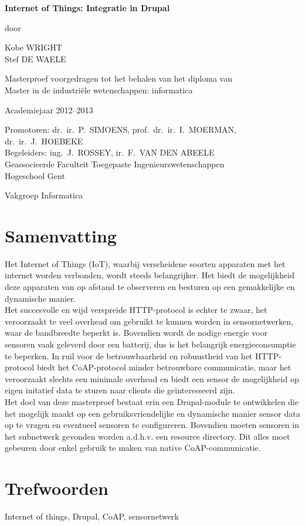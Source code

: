 
\newpage

{
\setlength{\baselineskip}{14pt}
\setlength{\parindent}{0pt}
\setlength{\parskip}{8pt}

\begin{center}

\noindent \textbf{\huge
Internet of Things: Integratie in Drupal
}

door 

Kobe WRIGHT\\
Stef DE WAELE

Masterproef voorgedragen tot het behalen van het diploma van\\
Master in de industri\"{e}le wetenschappen: informatica

Academiejaar 2012--2013

Promotoren: dr.~ir.~P.~SIMOENS, prof.~dr.~ir.~I.~MOERMAN, dr.~ir.~J.~HOEBEKE\\
Begeleiders: ing.~J.~ROSSEY, ir.~F.~VAN DEN ABEELE\\

Geassocieerde Faculteit Toegepaste Ingenieurswetenschappen\\
Hogeschool Gent

Vakgroep Informatica

\end{center}

\section*{Samenvatting}


Het Internet of Things (IoT), waarbij verscheidene soorten apparaten met het internet worden verbonden, wordt steeds belangrijker. Het biedt de mogelijkheid deze apparaten van op afstand te observeren en besturen op een gemakkelijke en dynamische manier.\\
Het succesvolle en wijd verspreide HTTP-protocol is echter te zwaar, het veroorzaakt te veel overhead om gebruikt te kunnen worden in sensornetwerken, waar de bandbreedte beperkt is. Bovendien wordt de nodige energie voor sensoren vaak geleverd door een batterij, dus is het belangrijk energieconsumptie te beperken. In ruil voor de betrouwbaarheid en robuustheid van het HTTP-protocol biedt het CoAP-protocol minder betrouwbare communicatie, maar het veroorzaakt slechts een minimale overhead en biedt een sensor de mogelijkheid op eigen initatief data te sturen naar clients die ge\"{i}nteresseerd zijn.\\
Het doel van deze masterproef bestaat erin een Drupal-module te ontwikkelen die het mogelijk maakt op een gebruiksvriendelijke en dynamische manier sensor data op te vragen en eventueel sensoren te configureren. Bovendien moeten sensoren in het subnetwerk gevonden worden a.d.h.v. een resource directory. Dit alles moet gebeuren door enkel gebruik te maken van native CoAP-communicatie. 


\section*{Trefwoorden}


Internet of things, Drupal, CoAP, sensornetwerk

}

\newpage %
